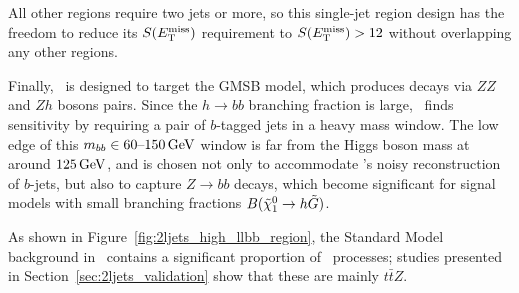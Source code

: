 All other regions require two jets or more, so this single-jet region design
has the freedom to reduce its $\metsig$ requirement to $\metsig > 12$
without overlapping any other regions.

Finally, \srllbb\ is designed to target the GMSB model, which produces decays
via $ZZ$ and $Zh$ bosons pairs.
Since the $h\to bb$ branching fraction is large, \srllbb\ finds
sensitivity by requiring a pair of $b$-tagged jets in a heavy mass window.
The low edge of this $\mbb \in 60\textrm{--}150\,\eV[G]$ window is far from the
Higgs boson mass at around $125\,\eV[G]$, and is chosen not only to
accommodate \atlas's noisy reconstruction of $b$-jets, but also to
capture $Z\to bb$ decays, which become significant for signal models
with small branching fractions $B(\neutralino_1 \to h \gravitino)$.

As shown in Figure~\ref{fig:2ljets_high_llbb_region}, the Standard Model
background in \srllbb\ contains a significant proportion of \topother\
processes; studies presented in Section~\ref{sec:2ljets_validation} show that
these are mainly $t\bar t Z$.

